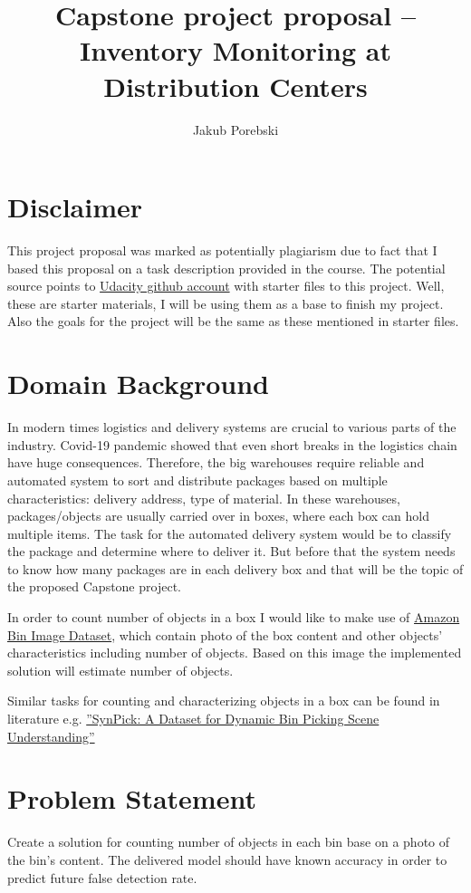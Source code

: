 \documentclass{article}
\title{Capstone project proposal -- Inventory Monitoring at Distribution Centers}
\author{Jakub Porebski}
\begin{document}
	\maketitle
	
\section*{Disclaimer}
This project proposal was marked as potentially plagiarism due to fact that I based this proposal on a task description provided in the course. The potential source points to \href{https://github.com/udacity/nd009t-capstone-starter}{Udacity github account} with starter files to this project. Well, these are starter materials, I will be using them as a base to finish my project. Also the goals for the project will be the same as these mentioned in starter files. 
	
\section{Domain Background}
In modern times logistics and delivery systems are crucial to various parts of the industry. Covid-19 pandemic showed that even short breaks in the logistics chain have huge consequences. Therefore, the big warehouses require reliable and automated system to sort and distribute packages based on multiple characteristics: delivery address, type of material. In these warehouses, packages/objects are usually carried over in boxes, where each box can hold multiple items. The task for the automated delivery system would be to classify the package and determine where to deliver it. But before that the system needs to know how many packages are in each delivery box and that will be the topic of the proposed Capstone project.

In order to count number of objects in a box I would like to make use of \href{https://registry.opendata.aws/amazon-bin-imagery/}{Amazon Bin Image Dataset}, which contain photo of the box content and other objects' characteristics including number of objects. Based on this image the implemented solution will estimate number of objects. 

Similar tasks for counting and characterizing objects in a box can be found in literature e.g. \href{https://arxiv.org/pdf/2107.04852.pdf}{''SynPick: A Dataset for Dynamic Bin Picking Scene Understanding''}

\section{Problem Statement}
Create a solution for counting number of objects in each bin base on a photo of the bin’s content. The delivered model should have known accuracy in order to predict future false detection rate.
\end{document}
